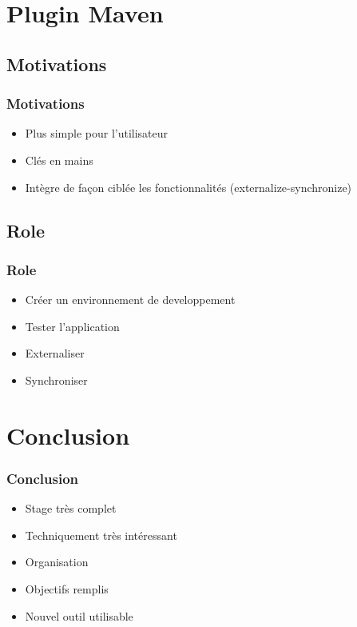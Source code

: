 \documentclass[12pt,a4paper,utf8x]{beamer}
\begin{document}
\section{Plugin Maven}
\subsection*{Motivations}
\begin{frame}\frametitle{Motivations}
\begin{itemize}
\item Plus simple pour l'utilisateur
\item Clés en mains
\item Intègre de façon ciblée les fonctionnalités (externalize-synchronize)
\end{itemize}
\end{frame}	

\subsection*{Role}
\begin{frame}\frametitle{Role}
\begin{itemize}
\item Créer un environnement de developpement
\item Tester l'application
\item Externaliser
\item Synchroniser
\end{itemize}

\end{frame}	

\section{Conclusion}
\begin{frame}\frametitle{Conclusion}
\begin{itemize}
\item Stage très complet
\item Techniquement très intéressant
\item Organisation
\item Objectifs remplis
\item Nouvel outil utilisable
\end{itemize}


\end{frame}	
\end{document}
